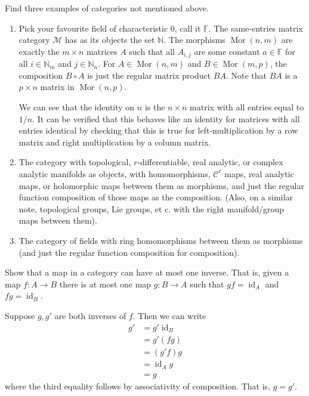 \documentclass[12 pt, letterpaper]{hmcpset}
\begin{document}
\begin{problem}[1.1.12]
	Find three examples of categories not mentioned above.
\end{problem}

\begin{solution}
	\begin{enumerate}[label = (\arabic*)]
		\item Pick your favourite field of characteristic $0$, call it $\mathbb{F}$. The same-entries matrix category $\mathscr{M}$ has as its objects the set $\mathbb{N}$. The morphisms $\operatorname{Mor}(n, m)$ are exactly the $m \times n$ matrices $A$ such that all $A_{i, j}$ are some constant $a \in \mathbb{F}$ for all $i \in \mathbb{N}_{m}$ and $j \in \mathbb{N}_{n}$. For $A \in \operatorname{Mor}(n, m)$ and $B \in \operatorname{Mor}(m, p)$, the composition $B \circ A$ is just the regular matrix product $BA$. Note that $BA$ is a $p \times n$ matrix in $\operatorname{Mor}(n, p)$.

			We can see that the identity on $n$ is the $n \times n$ matrix with all entries equal to $1/n$. It can be verified that this behaves like an identity for matrices with all entries identical by checking that this is true for left-multiplication by a row matrix and right multiplication by a column matrix.
		\item The category with topological, $r$-differentiable, real analytic, or complex analytic manifolds as objects, with homomorphisms, $\mathcal{C}^{r}$ maps, real analytic maps, or holomorphic maps between them as morphisms, and just the regular function composition of those maps as the composition. (Also, on a similar note, topological groups, Lie groups, et c. with the right manifold/group maps between them).
		\item The category of fields with ring homomorphisms between them as morphisms (and just the regular function composition for composition).
	\end{enumerate}
\end{solution}

\pagebreak

\begin{problem}[1.1.13]
	Show that a map in a category can have at most one inverse. That is, given a map $f : A \to B$ there is at most one map $g : B \to A$ such that $gf = \operatorname{id}_{A}$ and $fg = \operatorname{id}_{B}$.
\end{problem}

\begin{solution}
	Suppose $g, g'$ are both inverses of $f$. Then we can write
	\[
		\begin{split}
			g' & = g' \operatorname{id}_{B} \\
			   & = g' (f g) \\
			   & = (g' f) g \\
			   & = \operatorname{id}_{A} g \\
			   & = g
		\end{split}
	\]
	where the third equality follows by associativity of composition. That is, $g = g'$.
\end{solution}
\end{document}
